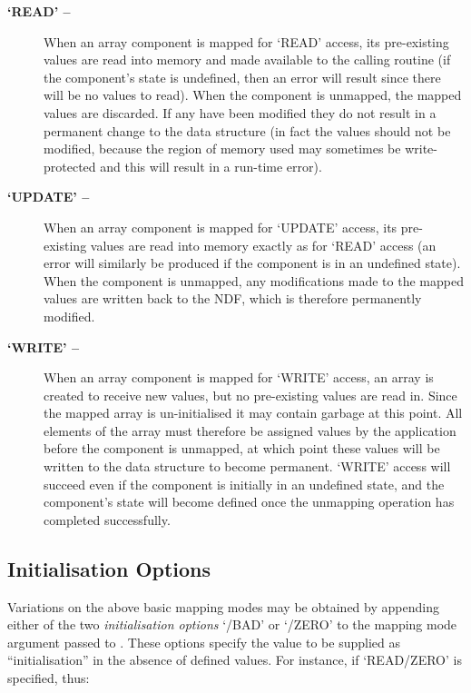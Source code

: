 \documentclass[twoside,11pt,nolof]{starlink}
\providecommand{\st}[1]{{\emph{#1}}}
\begin{document}
\begin{description}

\item[\textbf{`READ' --}] When an array component is mapped for `READ'
access, its pre-existing values are read into memory and made available to
the calling routine (if the component's state is undefined, then an error
will result since there will be no values to read).
When the component is unmapped, the mapped values are discarded.
If any have been modified they do not result in a permanent change to the
data structure (in fact the values should not be modified, because the
region of memory used may sometimes be write-protected and this will result
in a run-time error).

\item[\textbf{`UPDATE' --}] When an array component is mapped for `UPDATE' access,
its pre-existing values are read into memory exactly as for `READ' access (an
error will similarly be produced if the component is in an undefined state).
When the component is unmapped, any modifications made to the mapped values
are written back to the NDF, which is therefore permanently modified.

\item[\textbf{`WRITE' --}] When an array component is mapped for `WRITE'
access, an array is created to receive new values, but no pre-existing
values are read in.
Since the mapped array is un-initialised it may contain garbage at this
point.
All elements of the array must therefore be assigned values by the
application before the component is unmapped, at which point these values
will be written to the data structure to become permanent.
`WRITE' access will succeed even if the component is initially in an
undefined state, and the component's state will become defined once the
unmapping operation has completed successfully.

\end{description}

\subsection{\label{ss:initialisationoptions}Initialisation Options}

Variations on the above basic mapping modes may be obtained by appending
either of the two \st{initialisation options\/} `/BAD' or `/ZERO' to the
mapping mode argument passed to .
These options specify the value to be supplied as ``initialisation'' in the
absence of defined values.
For instance, if `READ/ZERO' is specified, thus:
\end{document}
